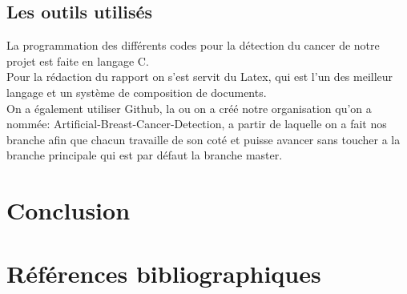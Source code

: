 \documentclass[a4paper,12pt]{report}
\begin{document}
\section{Les outils utilisés}
La programmation des différents codes pour la détection du cancer de notre projet est faite en langage C.\\
Pour la rédaction du rapport on s'est servit du Latex, qui est l'un des meilleur langage et un système de composition de documents.\\

On a également utiliser Github, la ou on a créé notre organisation qu'on a nommée: Artificial-Breast-Cancer-Detection, a partir de laquelle on a fait nos branche afin que chacun travaille de son coté et puisse avancer sans toucher a la branche principale qui est par défaut la branche master. 





\chapter*{Conclusion}



\chapter*{Références bibliographiques}
\end{document}
